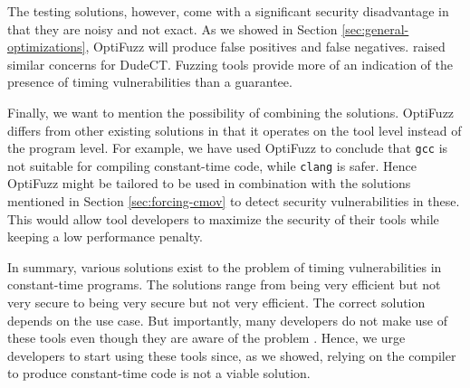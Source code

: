 The testing solutions, however, come with a significant security disadvantage in that they are noisy and not exact.
As we showed in Section \ref{sec:general-optimizations}, OptiFuzz will produce false positives and false negatives.
\citeauthor{dudect} raised similar concerns for DudeCT.
Fuzzing tools provide more of an indication of the presence of timing vulnerabilities than a guarantee.

Finally, we want to mention the possibility of combining the solutions.
OptiFuzz differs from other existing solutions in that it operates on the tool level instead of the program level.
For example, we have used OptiFuzz to conclude that \texttt{gcc} is not suitable for compiling constant-time code, while \texttt{clang} is safer.
Hence OptiFuzz might be tailored to be used in combination with the solutions mentioned in Section \ref{sec:forcing-cmov} to detect security vulnerabilities in these.
This would allow tool developers to maximize the security of their tools while keeping a low performance penalty.

In summary, various solutions exist to the problem of timing vulnerabilities in constant-time programs.
The solutions range from being very efficient but not very secure to being very secure but not very efficient.
The correct solution depends on the use case.
But importantly, many developers do not make use of these tools even though they are aware of the problem \citep{developer-survey-timing-attacks}.
Hence, we urge developers to start using these tools since, as we showed, relying on the compiler to produce constant-time code is not a viable solution.